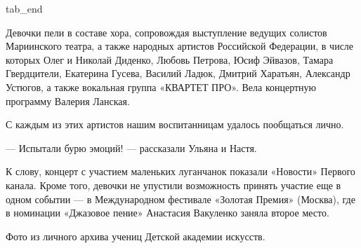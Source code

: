   tab_end
\fi

Девочки пели в составе хора, сопровождая выступление ведущих солистов
Мариинского театра, а также народных артистов Российской Федерации, в числе
которых Олег и Николай Диденко, Любовь Петрова, Юсиф Эйвазов, Тамара
Гвердцители, Екатерина Гусева, Василий Ладюк, Дмитрий Харатьян, Александр
Устюгов, а также вокальная группа «КВАРТЕТ ПРО». Вела концертную программу
Валерия Ланская.

С каждым из этих артистов нашим воспитанницам удалось пообщаться лично.

— Испытали бурю эмоций! — рассказали Ульяна и Настя.

К слову, концерт с участием маленьких луганчанок показали «Новости» Первого
канала. Кроме того, девочки не упустили возможность принять участие еще в одном
событии — в Международном фестивале «Золотая Премия» (Москва), где в номинации
«Джазовое пение» Анастасия Вакуленко заняла второе место.

Фото из личного архива учениц Детской академии искусств.
